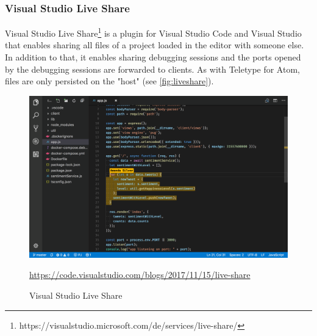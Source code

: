 \subsubsection{Visual Studio Live Share}
Visual Studio Live Share\footnote{https://visualstudio.microsoft.com/de/services/live-share/}  is a plugin for Visual Studio Code and Visual Studio that enables sharing all files of a project loaded in the editor with someone else. In addition to that, it enables sharing debugging sessions and the ports opened by the debugging sessions are forwarded to clients. As with Teletype for Atom, files are only persisted on the "host" (see \autoref{fig:liveshare}).
\begin{figure}[hb]
    \centering
    \includegraphics[width=1\linewidth]{figures/screenshots/vscodeliveshare.png}
	\caption{Visual Studio Live Share}
	\href{https://code.visualstudio.com/blogs/2017/11/15/live-share}{https://code.visualstudio.com/blogs/2017/11/15/live-share}
    \label{fig:liveshare}
\end{figure}
